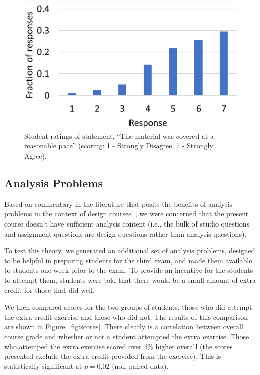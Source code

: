 \begin{figure}[ht]
\centering
\includegraphics[width=\columnwidth]{pace}
\caption{Student ratings of statement, ``The material was covered
at a reasonable pace''  (scoring: 1 - Strongly Disagree, 7 - Strongly Agree).}
\label{fig:pace}
\end{figure}

\subsection{Analysis Problems}

Based on commentary in the literature that posits the benefits of
analysis problems in the context of design courses~\cite{wjbo01},
we were concerned that the present
course doesn't have sufficient analysis content (i.e., the bulk of
studio questions and assignment questions are design questions rather
than analysis questions).

To test this theory, we generated an additional set of analysis problems,
designed to be helpful in preparing students for the third exam, and
made them available to students one week prior to the exam.  To provide
an incentive for the students to attempt them, students were told that
there would be a small amount of extra credit for those that did well.

We then compared scores for the two groups of students, those who did
attempt the extra credit exercise and those who did not.  The results
of this comparison are shown in Figure~\ref{fig:scores}.
There clearly is a correlation between overall course grade and
whether or not a student attempted the extra exercise.
Those who attemped the extra exercise scored over 4\% higher overall
(the scores presented exclude the extra credit provided from the
exercise).  This is statistically significant at $p = 0.02$ (non-paired data).

